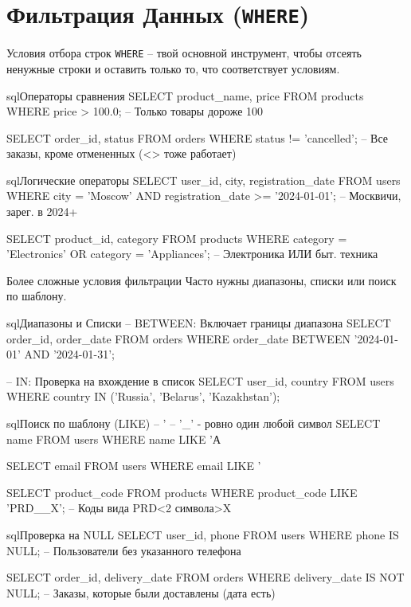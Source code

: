 \section{Фильтрация Данных (\texttt{WHERE})}

\begin{myblock}{Условия отбора строк}
    \texttt{WHERE} – твой основной инструмент, чтобы отсеять ненужные строки и оставить только то, что соответствует условиям.
    \begin{codebox}{sql}{Операторы сравнения}
    SELECT product_name, price
    FROM products
    WHERE price > 100.0; -- Только товары дороже 100

    SELECT order_id, status
    FROM orders
    WHERE status != 'cancelled'; -- Все заказы, кроме отмененных (<> тоже работает)
    \end{codebox}
    \begin{codebox}{sql}{Логические операторы}
    SELECT user_id, city, registration_date
    FROM users
    WHERE city = 'Moscow' AND registration_date >= '2024-01-01'; -- Москвичи, зарег. в 2024+

    SELECT product_id, category
    FROM products
    WHERE category = 'Electronics' OR category = 'Appliances'; -- Электроника ИЛИ быт. техника
    \end{codebox}
\end{myblock}

\begin{textbox}{Более сложные условия фильтрации}
    Часто нужны диапазоны, списки или поиск по шаблону.
    \begin{codebox}{sql}{Диапазоны и Списки}
    -- BETWEEN: Включает границы диапазона
    SELECT order_id, order_date
    FROM orders
    WHERE order_date BETWEEN '2024-01-01' AND '2024-01-31';

    -- IN: Проверка на вхождение в список
    SELECT user_id, country
    FROM users
    WHERE country IN ('Russia', 'Belarus', 'Kazakhstan');
    \end{codebox}
    \begin{codebox}{sql}{Поиск по шаблону (LIKE)}
    -- '%
    -- '_' - ровно один любой символ
    SELECT name
    FROM users
    WHERE name LIKE 'А%

    SELECT email
    FROM users
    WHERE email LIKE '%

    SELECT product_code
    FROM products
    WHERE product_code LIKE 'PRD__X'; -- Коды вида PRD<2 символа>X
    \end{codebox}
    \begin{codebox}{sql}{Проверка на NULL}
    SELECT user_id, phone
    FROM users
    WHERE phone IS NULL; -- Пользователи без указанного телефона

    SELECT order_id, delivery_date
    FROM orders
    WHERE delivery_date IS NOT NULL; -- Заказы, которые были доставлены (дата есть)
    \end{codebox}
\end{textbox}

